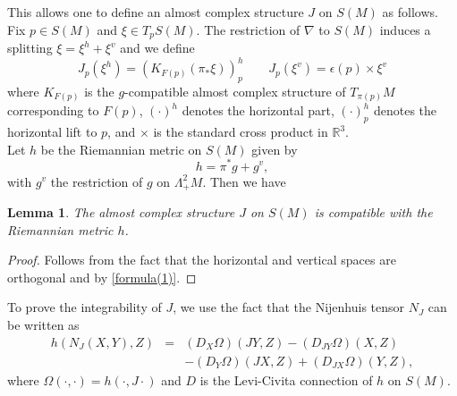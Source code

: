 \documentclass[11pt]{amsart}
\theoremstyle{definition}
\theoremstyle{plain}
\theoremstyle{definition}
\theoremstyle{plain}
\newtheorem{Lemma}[Def]{Lemma}
\theoremstyle{remark}
\theoremstyle{plain}
\newcommand{\numberset}{\mathbb}
\newcommand{\R}{\numberset{R}}
\newcommand{\n}{\nabla}
\begin{document}
 This allows one to define an almost complex structure $J$  on $S(M)$ as follows. Fix $p\in S(M) $ and $\xi \in T_p S(M)$. The restriction of $\n$ to $S(M)$ induces a splitting $\xi =\xi^h +\xi^v $ and we define
 	\begin{equation} \label{formula(1)}
 	J_p(\xi^h)=(K_{F(p)} (\pi_*\xi) )^h_p  \qquad  J_p(\xi^v)=\epsilon(p) \times \xi^v
 	\end{equation}
 	where $K_{F(p)}$ is the $g$-compatible  almost complex structure  of $T _{\pi(p)}M $ corresponding to $F(p)$, $(\cdot)^h$ denotes  the horizontal part, $(\cdot)^h_p$ denotes  the horizontal lift to $p$, and $\times$ is the standard cross product in $\R^3$. \\
  Let $h$ be the Riemannian metric on $S(M)$ given by $$h=\pi^* g + g^v, $$ with $g^v$ the restriction of $g$ on $\Lambda^2_+ M $. Then we have
  \begin{Lemma}
      The almost complex structure $J$ on $S(M)$ is  compatible with the Riemannian metric $h$.
  \end{Lemma}
  \begin{proof}
      Follows from the fact that the horizontal and vertical spaces are orthogonal and by   \eqref{formula(1)}.
  \end{proof}
  
  


  \smallskip  
  
  
  
  
To prove the integrability of $J$, we use the fact that the Nijenhuis tensor $N_J$ can be written as
$$
\begin{array}{lcl}
h( N_J(X,Y),Z ) &=  & (D_X \Omega) (JY,Z) -  (D_{JY}\Omega) (X, Z) \\[3pt]
&& - (D_{Y}\Omega) (JX, Z) + (D_{JX}\Omega) (Y, Z),
\end{array}
$$
where $\Omega(\cdot ,\cdot)=h( \cdot ,J \cdot)$ and $D$ is the Levi-Civita connection of $h$ on $S(M)$. \\
\end{document}
